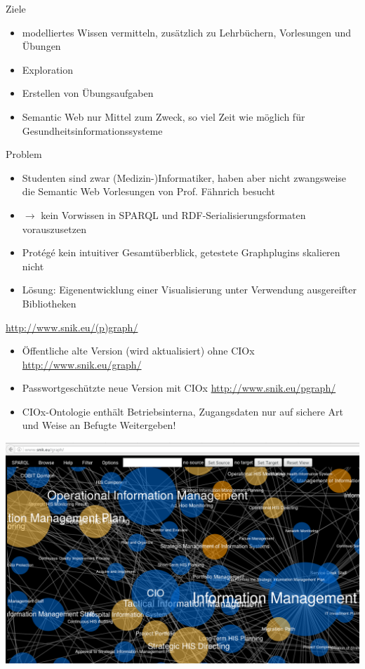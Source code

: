 \documentclass[14pt,aspectratio=1610]{beamer}
\begin{document}
\begin{frame}{Ziele}
\begin{itemize}
\item modelliertes Wissen vermitteln, zusätzlich zu Lehrbüchern, Vorlesungen und Übungen
\item Exploration 
\item Erstellen von Übungsaufgaben
\item Semantic Web nur Mittel zum Zweck, so viel Zeit wie möglich für Gesundheitsinformationssysteme 
\end{itemize}
\end{frame}

\begin{frame}{Problem}
\begin{itemize}
\item Studenten sind zwar (Medizin-)Informatiker, haben aber nicht zwangsweise die Semantic Web Vorlesungen von Prof. Fähnrich besucht
\item $\rightarrow$ kein Vorwissen in SPARQL und RDF-Serialisierungsformaten vorauszusetzen
\item Protégé kein intuitiver Gesamtüberblick, getestete Graphplugins skalieren nicht
\item Lösung: Eigenentwicklung einer Visualisierung unter Verwendung ausgereifter Bibliotheken
\end{itemize}
\end{frame}

\begin{frame}{\url{http://www.snik.eu/(p)graph/}}
\begin{itemize}
\item Öffentliche alte Version (wird aktualisiert) ohne CIOx \url{http://www.snik.eu/graph/}
\item Passwortgeschützte neue Version mit CIOx \url{http://www.snik.eu/pgraph/}
\item CIOx-Ontologie enthält Betriebsinterna, Zugangsdaten nur auf sichere Art und Weise an Befugte Weitergeben! 
\end{itemize}
\end{frame}

\begin{frame}{}
\centering\includegraphics[width=1.05\textwidth,height=1.05\textheight,keepaspectratio]{img/browser.png}
\end{frame}
\end{document}
